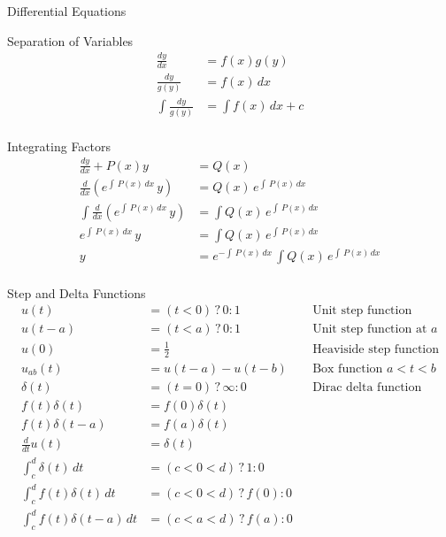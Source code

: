 %
%

\begin{section}{Differential Equations}
  \begin{subsection}{Separation of Variables}
    \begin{align*}
      \frac{dy}{dx} &= f(x)g(y) \\
      \frac{dy}{g(y)} &= f(x)\,dx \\
      \int{\frac{dy}{g(y)}} &= \int{f(x)}\,dx+c \\
    \end{align*}
  \end{subsection}
  \begin{subsection}{Integrating Factors}
    \begin{align*}
      \frac{dy}{dx} + P(x)y &= Q(x) \\
      \frac{d}{dx}(e^{\int\,P(x)\,dx}\,y) &= Q(x)\,e^{\int\,P(x)\,dx} \\
      \int{\frac{d}{dx}(e^{\int\,P(x)\,dx}\,y)} &= \int{Q(x)\,e^{\int\,P(x)\,dx}} \\
      e^{\int\,P(x)\,dx}\,y &= \int{Q(x)\,e^{\int\,P(x)\,dx}} \\
      y &= e^{-\int\,P(x)\,dx}\,\int{Q(x)\,e^{\int\,P(x)\,dx}} \\
    \end{align*}
  \end{subsection}
  \begin{subsection}{Step and Delta Functions}
    \begin{align*}
      u(t) &= (t<0) \,?\, 0 : 1 && \text{Unit step function}\\
      u(t-a) &= (t<a) \,?\, 0 : 1 && \text{Unit step function at $a$}\\
      u(0) &= \frac{1}{2} && \text{Heaviside step function}\\
      u_{ab}(t) &= u(t-a) - u(t-b) && \text{Box function $a<t<b$}\\
      \delta(t) &= (t=0)\,?\,\infty : 0 && \text{Dirac delta function}\\
      f(t)\delta(t) &= f(0)\delta(t) \\
      f(t)\delta(t-a) &= f(a)\delta(t) \\
      \frac{d}{dt}u(t) &= \delta(t)\\
      \int_c^d \delta(t)\,dt &= (c<0<d)\,?\,1:0 \\
      \int_c^d f(t)\delta(t)\,dt &= (c<0<d)\,?\,f(0):0 \\
      \int_c^d f(t)\delta(t-a)\,dt &= (c<a<d)\,?\,f(a):0 \\
    \end{align*}
  \end{subsection}
\end{section}
